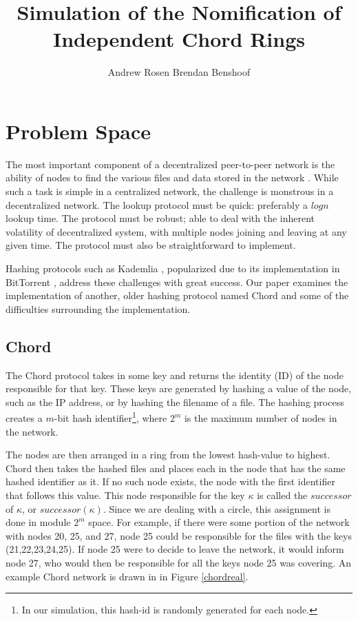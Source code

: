 \documentclass[12pt]{ieeetran} %
\title{Simulation of the Nomification of Independent Chord Rings}
\author{Andrew Rosen \qquad Brendan Benshoof }
\date{} %
\begin{document}
\maketitle
\newpage
\section{Problem Space}

The most important component of a decentralized peer-to-peer network is the ability of nodes to find the various files and data stored in the network \cite{Chord}.  While such a task is simple in a centralized network, the challenge is monstrous in a decentralized network.  The lookup protocol must be quick:  preferably a $log n$ lookup time.  The protocol must be robust; able to deal with the inherent volatility of decentralized system, with multiple nodes joining and leaving at any given time.  The protocol must also be straightforward to implement.

Hashing protocols such as Kademlia \cite{Kademlia}, popularized due to its implementation in BitTorrent \cite{BitTorrent}, address these challenges with great success.  Our paper examines the implementation of another, older hashing protocol named Chord \cite{Chord} and some of the difficulties surrounding the implementation.
\subsection{Chord}

The Chord protocol \cite{Chord} takes in some key and returns the identity (ID) of the node responsible for that key.  These keys are generated by hashing a value of the node, such as the IP address, or by hashing  the filename of a file.  The hashing process creates a $m$-bit hash identifier\footnote{In our simulation, this hash-id is randomly generated for each node.}, where $2^m$ is the maximum number of nodes in the network.

The nodes are then arranged in a ring from the lowest hash-value to highest.  Chord then takes the hashed files and places each in the node that has the same hashed identifier as it.  If no such node exists, the node with the first identifier that follows this value.  This node responsible for the key $\kappa$ is called the $successor$ of $\kappa$, or $successor(\kappa)$.  Since we are dealing with a circle, this assignment is done in module $2^m$ space.  For example, if there were some portion of the network with nodes 20, 25, and 27, node 25 could be responsible for the files with the keys (21,22,23,24,25). If node 25 were to decide to leave the network, it would inform node 27, who would then be responsible for all the keys node 25 was covering. An example Chord network is drawn in in Figure \ref{chordreal}.
\end{document}
